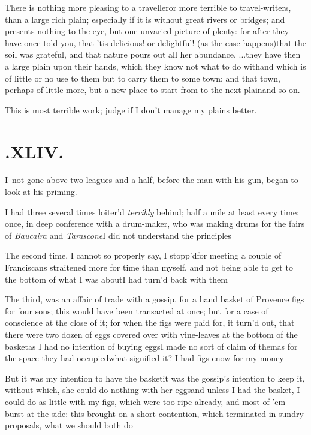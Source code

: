 \documentclass{article}
\begin{document}
There is nothing more pleasing to a traveller\tsh or
more terrible to travel-writers, than a large rich plain;
especially if it is without great rivers or bridges; and presents
nothing to the eye, but one unvaried picture of plenty: for after
they have once told you, that ’tis delicious! or delightful!
(as the case happens)\tsk that the soil was grateful, and that
nature pours out all her abundance, \etc .\@ .\@ .\@ they
have then a large plain upon their hands, which they know not\pb
what to do with\tsk and which is of little or no use to them but
to carry them to some town; and that town, perhaps of little
more, but a new place to start from to the next plain\tsh and so
on.

\tsh This is most terrible work; judge if I don’t manage
my plains better.

\section{.\enspace XLIV.}

\lettrine{I}{\,} not gone above two leagues and
a half, before the man with his gun, began to look at his
priming.

I had three several times loiter’d \textit{terribly} behind;
half a mile at least every time: once, in deep conference with a
drum-maker, who was making drums for the fairs of \textit{Baucaira}
and \textit{Tarascone}\tsk I did not understand the
principles\tsh

\newpage
The second time, I cannot so properly say, I
stopp’d\tsh for meeting a couple of
Franciscans straitened more for time than myself, and not
being able to get to the bottom of what I was about\tsh I
had turn’d back with them\tsh

The third, was an affair of trade with a gossip, for a
hand basket of Provence figs for four sous; this would have
been transacted at once; but for a case of conscience at the close
of it; for when the figs were paid for, it turn’d out,
that there were two dozen of eggs covered over with
vine-leaves at the bottom of the basket\tsk as I had no intention
of buying eggs\tsk I made no sort of claim of them\tsk as for
the space they had occupied\tsk what signified it? I had figs
enow for my money\tsh

\newpage
\tsh But it was my intention to have the basket\tsk it was
the gossip’s intention to keep it, without which, she could
do nothing with her eggs\tsh and unless I had the basket,
I could do as little with my figs, which were too ripe already, and
most of ’em burst at the side: this brought on a short
contention, which terminated in sundry proposals, what we should
both do\tsh
\end{document}
